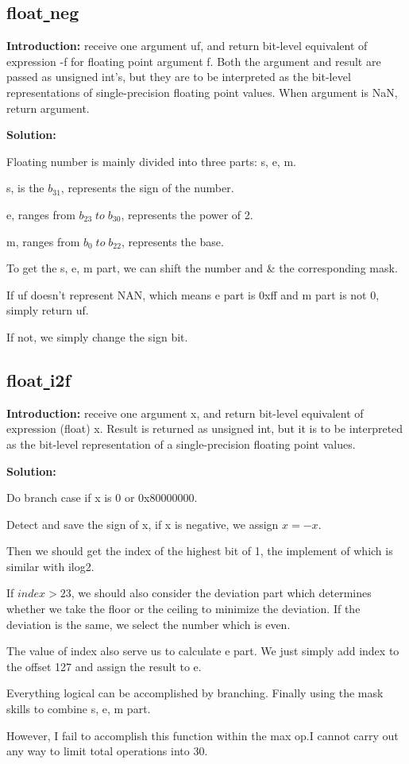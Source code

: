 \documentclass[12pt,a4paper]{article}
\theoremstyle{definition}
\numberwithin{equation}{section}
\numberwithin{figure}{section}
\begin{document}
\begin{spacing}{1.5}
\subsection{float\underline{ }neg}
\textbf{Introduction: }receive one argument uf, and return bit-level equivalent of expression -f for floating point argument f. Both the argument and result are passed as unsigned int's, but they are to be interpreted as the bit-level representations of single-precision floating point values. When argument is NaN, return argument.\par
\textbf{Solution: }\par
Floating number is mainly divided into three parts: s, e, m.\par
s, is the $b_{31}$, represents the sign of the number.\par
e, ranges from $b_{23}\;to\;b_{30}$, represents the power of 2.\par
m, ranges from $b_0\;to\;b_{22}$, represents the base.\par
To get the s, e, m part, we can shift the number and \& the corresponding mask.\par
If uf doesn't represent NAN, which means e part is 0xff and m part is not 0, simply return uf.\par
If not, we simply change the sign bit.

\subsection{float\underline{ }i2f}
\textbf{Introduction: }receive one argument x, and return bit-level equivalent of expression (float) x. Result is returned as unsigned int, but it is to be interpreted as the bit-level representation of a single-precision floating point values.\par
\textbf{Solution: }\par
Do branch case if x is 0 or 0x80000000.\par
Detect and save the sign of x, if x is negative, we assign $x = -x$.\par
Then we should get the index of the highest bit of 1, the implement of which is similar with ilog2.\par
If $index > 23$, we should also consider the deviation part which determines whether we take the floor or the ceiling to minimize the deviation. If the deviation is the same, we select the number which is even.\par
The value of index also serve us to calculate e part. We just simply add index to the offset 127 and assign the result to e.\par
Everything logical can be accomplished by branching. Finally using the mask skills to combine s, e, m part.\par
However, I fail to accomplish this function within the max op.I cannot carry out any way to limit total operations into 30.\par


\end{spacing}
\end{document}
